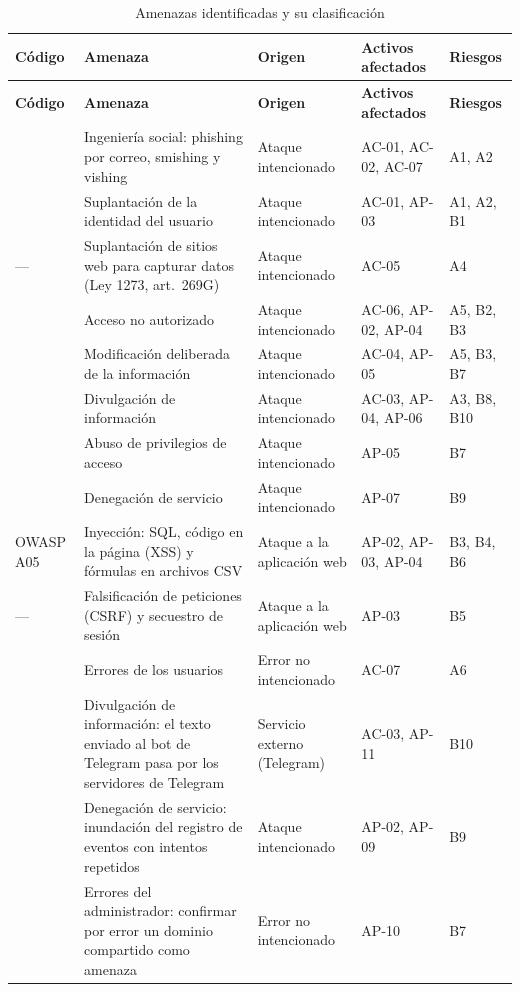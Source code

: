 \documentclass[journal,onecolumn,12pt,draftclsnofoot]{IEEEtran}
\begin{document}
\begingroup
\footnotesize
\setlength{\tabcolsep}{3pt}
\begin{longtable}{|>{\raggedright\arraybackslash}p{}|>{\raggedright\arraybackslash}p{}|>{\raggedright\arraybackslash}p{}|>{\raggedright\arraybackslash}p{}|>{\raggedright\arraybackslash}p{}|}
\caption{Amenazas identificadas y su clasificación}\label{tab:amenazas}\\
\hline
\textbf{Código} & \textbf{Amenaza} & \textbf{Origen} & \textbf{Activos afectados} & \textbf{Riesgos} \\ \hline
\endfirsthead
\hline
\textbf{Código} & \textbf{Amenaza} & \textbf{Origen} & \textbf{Activos afectados} & \textbf{Riesgos} \\ \hline
\endhead
[A.30] & Ingeniería social: phishing por correo, smishing y vishing & Ataque intencionado & AC-01, AC-02, AC-07 & A1, A2 \\ \hline
[A.5] & Suplantación de la identidad del usuario & Ataque intencionado & AC-01, AP-03 & A1, A2, B1 \\ \hline
--- & Suplantación de sitios web para capturar datos (Ley 1273, art.\ 269G) & Ataque intencionado & AC-05 & A4 \\ \hline
[A.11] & Acceso no autorizado & Ataque intencionado & AC-06, AP-02, AP-04 & A5, B2, B3 \\ \hline
[A.15] & Modificación deliberada de la información & Ataque intencionado & AC-04, AP-05 & A5, B3, B7 \\ \hline
[A.19] & Divulgación de información & Ataque intencionado & AC-03, AP-04, AP-06 & A3, B8, B10 \\ \hline
[A.6] & Abuso de privilegios de acceso & Ataque intencionado & AP-05 & B7 \\ \hline
[A.24] & Denegación de servicio & Ataque intencionado & AP-07 & B9 \\ \hline
OWASP A05 & Inyección: SQL, código en la página (XSS) y fórmulas en archivos CSV & Ataque a la aplicación web & AP-02, AP-03, AP-04 & B3, B4, B6 \\ \hline
--- & Falsificación de peticiones (CSRF) y secuestro de sesión & Ataque a la aplicación web & AP-03 & B5 \\ \hline
[E.1] & Errores de los usuarios & Error no intencionado & AC-07 & A6 \\ \hline
[A.19] & Divulgación de información: el texto enviado al bot de Telegram pasa por los servidores de Telegram & Servicio externo (Telegram) & AC-03, AP-11 & B10 \\ \hline
[A.24] & Denegación de servicio: inundación del registro de eventos con intentos repetidos & Ataque intencionado & AP-02, AP-09 & B9 \\ \hline
[E.2] & Errores del administrador: confirmar por error un dominio compartido como amenaza & Error no intencionado & AP-10 & B7 \\ \hline
\end{longtable}
\endgroup
\end{document}
